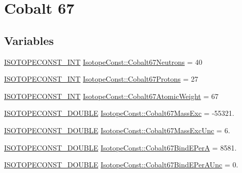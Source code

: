 \hypertarget{group___isotope_const-_cobalt-_co67}{}\section{Cobalt 67}
\label{group___isotope_const-_cobalt-_co67}
\subsection*{Variables}
\begin{DoxyCompactItemize}
\item 
\mbox{\hyperlink{group___isotope_const-_macros_ga5f18360b3e99483a35c32d789e62621c}{I\+S\+O\+T\+O\+P\+E\+C\+O\+N\+S\+T\+\_\+\+I\+NT}} \mbox{\hyperlink{group___isotope_const-_cobalt-_co67_ga46d9dfeda2ed8168a52b70706bb378f3}{Isotope\+Const\+::\+Cobalt67\+Neutrons}} = 40
\item 
\mbox{\hyperlink{group___isotope_const-_macros_ga5f18360b3e99483a35c32d789e62621c}{I\+S\+O\+T\+O\+P\+E\+C\+O\+N\+S\+T\+\_\+\+I\+NT}} \mbox{\hyperlink{group___isotope_const-_cobalt-_co67_ga55eb3eb9e08475702539ceb39ba0fb4b}{Isotope\+Const\+::\+Cobalt67\+Protons}} = 27
\item 
\mbox{\hyperlink{group___isotope_const-_macros_ga5f18360b3e99483a35c32d789e62621c}{I\+S\+O\+T\+O\+P\+E\+C\+O\+N\+S\+T\+\_\+\+I\+NT}} \mbox{\hyperlink{group___isotope_const-_cobalt-_co67_ga9d07517df4c70b7ab0ec004acf390ea6}{Isotope\+Const\+::\+Cobalt67\+Atomic\+Weight}} = 67
\item 
\mbox{\hyperlink{group___isotope_const-_macros_ga8f45a7272ce02c0b4c65c44636ed719a}{I\+S\+O\+T\+O\+P\+E\+C\+O\+N\+S\+T\+\_\+\+D\+O\+U\+B\+LE}} \mbox{\hyperlink{group___isotope_const-_cobalt-_co67_gacd8c6c2e43c903d265bfab39ab2e8cfe}{Isotope\+Const\+::\+Cobalt67\+Mass\+Exc}} = -\/55321.
\item 
\mbox{\hyperlink{group___isotope_const-_macros_ga8f45a7272ce02c0b4c65c44636ed719a}{I\+S\+O\+T\+O\+P\+E\+C\+O\+N\+S\+T\+\_\+\+D\+O\+U\+B\+LE}} \mbox{\hyperlink{group___isotope_const-_cobalt-_co67_ga2d4506daaf54b0175553ff34f57fd7ae}{Isotope\+Const\+::\+Cobalt67\+Mass\+Exc\+Unc}} = 6.
\item 
\mbox{\hyperlink{group___isotope_const-_macros_ga8f45a7272ce02c0b4c65c44636ed719a}{I\+S\+O\+T\+O\+P\+E\+C\+O\+N\+S\+T\+\_\+\+D\+O\+U\+B\+LE}} \mbox{\hyperlink{group___isotope_const-_cobalt-_co67_ga719d2329c9af3155c8d6ade3d627054b}{Isotope\+Const\+::\+Cobalt67\+Bind\+E\+PerA}} = 8581.
\item 
\mbox{\hyperlink{group___isotope_const-_macros_ga8f45a7272ce02c0b4c65c44636ed719a}{I\+S\+O\+T\+O\+P\+E\+C\+O\+N\+S\+T\+\_\+\+D\+O\+U\+B\+LE}} \mbox{\hyperlink{group___isotope_const-_cobalt-_co67_ga2b58c61d27f46f1f9f46d20b5d29c946}{Isotope\+Const\+::\+Cobalt67\+Bind\+E\+Per\+A\+Unc}} = 0.

\end{DoxyCompactItemize}
